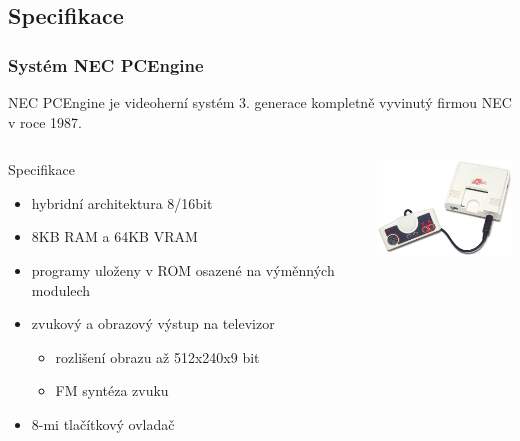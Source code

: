 \documentclass[10pt]{beamer}
\begin{document}
\subsection{Specifikace}
\begin{frame}
\frametitle{Systém NEC PCEngine}
NEC PCEngine je videoherní systém 3. generace kompletně vyvinutý firmou NEC v
roce 1987.
\begin{columns}
	\begin{block}{Specifikace}
	\begin{itemize}
		\item hybridní architektura 8/16bit
		\item 8KB RAM a 64KB VRAM
		\item programy uloženy v ROM osazené na výměnných modulech
		\item zvukový a obrazový výstup na televizor
		\begin{itemize}
			\item rozlišení obrazu až 512x240x9 bit
			\item FM syntéza zvuku
		\end{itemize}
		\item 8-mi tlačítkový ovladač
	\end{itemize}
	\end{block}
	\begin{center}
		\includegraphics[width=4cm]{fig/pce_photo}
	\end{center}
\end{columns}
\end{frame}

\end{document}

